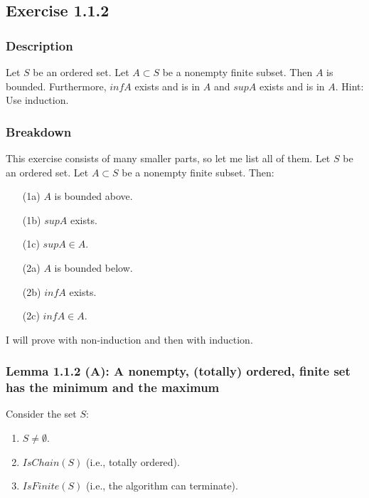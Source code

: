 \documentclass[12pt, letterpaper, oneside]{book}
\begin{document}
\subsection{Exercise 1.1.2}

\subsubsection{Description}

Let $S$ be an ordered set. Let $A \subset S$ be a nonempty finite subset. Then $A$ is bounded. Furthermore, $inf A$
exists and is in $A$ and $sup A$ exists and is in $A$. Hint: Use induction.

\subsubsection{Breakdown}

This exercise consists of many smaller parts, so let me list all of them. Let $S$ be an ordered set. Let $A \subset S$
be a nonempty finite subset. Then:
\begin{enumerate}
  \item[(1a)] $A$ is bounded above.
  \item[(1b)] $sup A$ exists.
  \item[(1c)] $sup A \in A$.
  \item[(2a)] $A$ is bounded below.
  \item[(2b)] $inf A$ exists.
  \item[(2c)] $inf A \in A$.
\end{enumerate}

I will prove with non-induction and then with induction.

\subsubsection{Lemma 1.1.2 (A): A nonempty, (totally) ordered, finite set has the minimum and the maximum}

Consider the set $S$:
\begin{enumerate}
  \item $S \ne \emptyset$.
  \item $IsChain(S)$ (i.e., totally ordered).
  \item $IsFinite(S)$ (i.e., the algorithm can terminate).
\end{enumerate}
\end{document}
